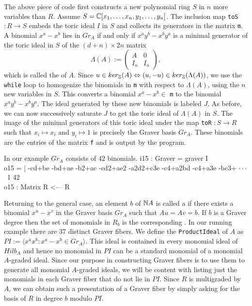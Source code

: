    The above piece of code first constructs a new polynomial ring $S$
   in $n$ more variables than $R$. Assume $S = \mathbb{C} [x_1, \ldots, x_n,
   y_1, \ldots, y_n]$. The inclusion map {\tt toS} $: R \rightarrow
   S$ embeds the toric ideal $I$ in $S$ and collects its generators in
   the matrix {\tt m}. A binomial $x^a - x^b$ lies in $Gr_A$ if and only
   if $x^ay^b-x^by^a$ is a minimal generator of the toric ideal in $S$
   of the $(d+n) \times 2n$ matrix $$\Lambda(A) := \left (
     \begin{array}{cc} A & 0 \\ I_n & I_n \end{array} \right),$$ which
   is called the {\em {}} of $A$. Since $u \in
   ker_{\mathbb{Z}}(A) \Leftrightarrow (u,-u) \in ker_{\mathbb{Z}} (\Lambda(A))$, we
   use the {\tt while} loop to homogenize the binomials in {\tt m} with
   respect to $\Lambda(A)$, using the $n$ new variables in $S$. This
   converts a binomial $x^a-x^b \in$ {\tt m} to the binomial
   $x^ay^b-x^by^a$.  The ideal generated by these new binomials is
   labeled $J$. As before, we can now successively saturate $J$
   to get the toric ideal of $\Lambda(A)$ in $S$. The image of the
   minimal generators of this toric ideal under the map {\tt toR}
   $: S \rightarrow R$ such that $x_i \mapsto x_i$ and $y_i \mapsto 1$
   is precisely the Graver basis $Gr_A$. These binomials are the
   entries of the matrix {\tt f} and is output by the program.

In our example $Gr_A$ consists of $42$ binomials.
\beginOutput
i15 : Graver = graver I \\
\emptyLine
o15 = | -cd+be -bd+ae -b2+ac -cd2+ae2 -a2d2+c3e -c4+a2bd -c4+a3e -bc3+ $\cdot\cdot\cdot$\\
\emptyLine
\              1       42\\
o15 : Matrix R  <--- R\\
\endOutput
 

Returning to the general case, an element $b $ of $\mathbb{N} A$ is called a
{\it {}} if there exists a binomial $x^u - x^v$ in the
Graver basis $Gr_A$ such that $Au = Av = b$. If $b$ is a Graver degree
then the set of monomials in $R_b$ is the corresponding {\it {}}.  In our running example there are $37$ distinct Graver
fibers. We define the {\tt ProductIdeal} of $A$ as $PI := 
\langle x^ax^b : x^a-x^b  \in Gr_A \rangle$. This ideal is contained in
every monomial ideal of $Hilb_A$ and hence no monomial in $PI$ can be
a standard monomial of a monomial $A$-graded ideal. Since our purpose
in constructing Graver fibers is to use them to 
generate all monomial $A$-graded ideals, we will be content with
listing just the monomials in each Graver fiber that do not lie in
$PI$.  Since $R$ is multigraded by $A$, we can obtain such a
presentation of a Graver fiber by simply asking for the basis of $R$
in degree $b$ modulo $PI$.  

